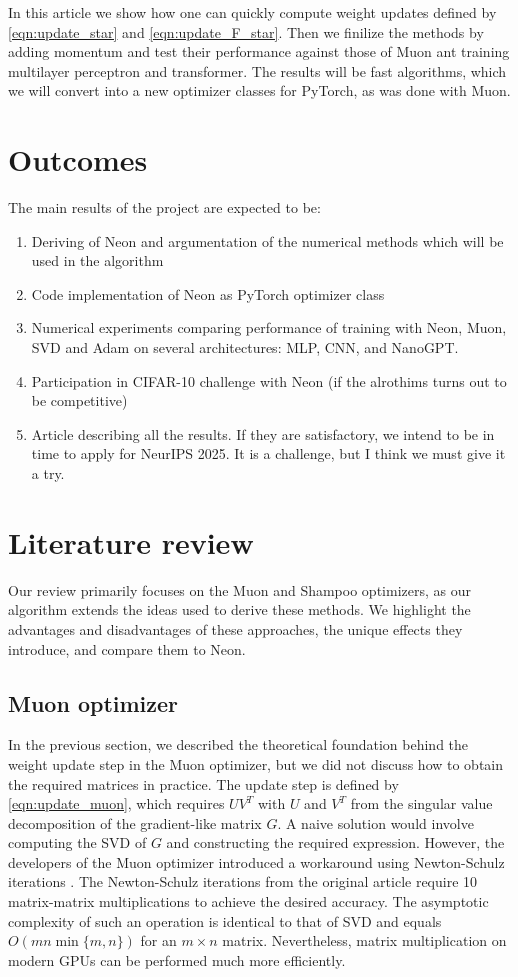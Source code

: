 \documentclass[]{scrartcl}
\begin{document}
In this article we show how one can quickly compute weight updates defined by \eqref{eqn:update_star} and \eqref{eqn:update_F_star}. Then we finilize the methods by adding momentum and test their performance against those of Muon ant training multilayer perceptron and transformer. The results will be fast algorithms, which we will convert into a new optimizer classes for PyTorch, as was done with Muon.

\section{Outcomes}
The main results of the project are expected to be:
\begin{enumerate}
    \item Deriving of Neon and argumentation of the numerical methods which will be used in the algorithm
    \item Code implementation of Neon as PyTorch optimizer class
    \item Numerical experiments comparing performance of training with Neon, Muon, SVD and Adam on several architectures: MLP, CNN, and NanoGPT.
    \item Participation in CIFAR-10 challenge with Neon (if the alrothims turns out to be competitive)
    \item Article describing all the results. If they are satisfactory, we intend to be in time to apply for NeurIPS 2025. It is a challenge, but I think we must give it a try.
\end{enumerate}

\section{Literature review}
Our review primarily focuses on the Muon and Shampoo optimizers, as our algorithm extends the ideas used to derive these methods. We highlight the advantages and disadvantages of these approaches, the unique effects they introduce, and compare them to Neon.

\subsection{Muon optimizer}

In the previous section, we described the theoretical foundation behind the weight update step in the Muon optimizer, but we did not discuss how to obtain the required matrices in practice. The update step is defined by \eqref{eqn:update_muon}, which requires $UV^T$ with $U$ and $V^T$ from the singular value decomposition of the gradient-like matrix $G$. A naive solution would involve computing the SVD of $G$ and constructing the required expression. However, the developers of the Muon optimizer introduced a workaround using Newton-Schulz iterations \cite{jordan2024muon}. The Newton-Schulz iterations from the original article \cite{jordan2024muon} require 10 matrix-matrix multiplications to achieve the desired accuracy. The asymptotic complexity of such an operation is identical to that of SVD and equals $O(mn \min\{m, n\})$ for an $m \times n$ matrix. Nevertheless, matrix multiplication on modern GPUs can be performed much more efficiently.
\end{document}
